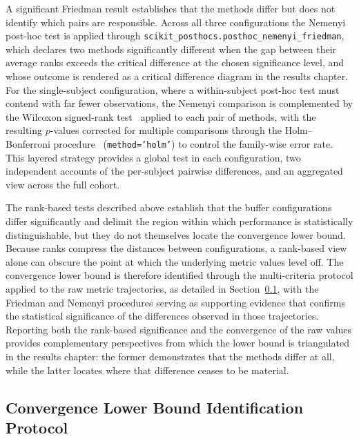 \documentclass[MScCS,12pt,oneside,final]{uccthesis}
\begin{document}
A significant Friedman result establishes that the methods differ but does not identify which pairs are responsible. Across all three configurations the Nemenyi post-hoc test is applied through \texttt{scikit\_posthocs.posthoc\_nemenyi\_friedman}, which declares two methods significantly different when the gap between their average ranks exceeds the critical difference at the chosen significance level, and whose outcome is rendered as a critical difference diagram in the results chapter. For the single-subject configuration, where a within-subject post-hoc test must contend with far fewer observations, the Nemenyi comparison is complemented by the Wilcoxon signed-rank test~\parencite{wilcoxon1945individual} applied to each pair of methods, with the resulting $p$-values corrected for multiple comparisons through the Holm--Bonferroni procedure~\parencite{holm1979simple} (\texttt{method='holm'}) to control the family-wise error rate. This layered strategy provides a global test in each configuration, two independent accounts of the per-subject pairwise differences, and an aggregated view across the full cohort.

The rank-based tests described above establish that the buffer configurations differ significantly and delimit the region within which performance is statistically distinguishable, but they do not themselves locate the convergence lower bound. Because ranks compress the distances between configurations, a rank-based view alone can obscure the point at which the underlying metric values level off. The convergence lower bound is therefore identified through the multi-criteria protocol applied to the raw metric trajectories, as detailed in Section~\ref{subsec:convergence_lower_bound}, with the Friedman and Nemenyi procedures serving as supporting evidence that confirms the statistical significance of the differences observed in those trajectories. Reporting both the rank-based significance and the convergence of the raw values provides complementary perspectives from which the lower bound is triangulated in the results chapter: the former demonstrates that the methods differ at all, while the latter locates where that difference ceases to be material.

\subsection{Convergence Lower Bound Identification Protocol}
\label{subsec:convergence_lower_bound}
\end{document}
